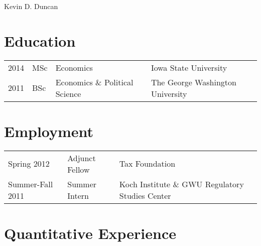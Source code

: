 \documentclass[letterpaper]{article}
\def\name{Kevin D. Duncan}
\begin{document}
{\huge \name} 


\vspace{0.0in}



\section*{Education}

\begin{tabular}{@{}llll}
    2014 & MSc & Economics &Iowa State University \\
  2011 & BSc & Economics \& Political Science & The George Washington University
\end{tabular}

\section*{Employment}

\begin{tabular}{@{}llll}
  Spring 2012 & Adjunct Fellow & Tax Foundation \\
  Summer-Fall 2011 & Summer Intern & Koch Institute \& GWU Regulatory Studies Center \\
\end{tabular}


\section*{Quantitative Experience}
\end{document}
